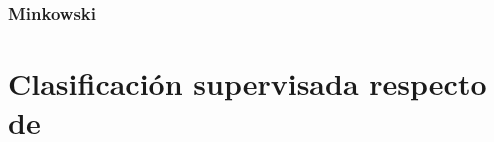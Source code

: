 \documentclass[10pt,a4paper]{article}
\begin{document}
\subsubsection{Minkowski}

\section{Clasificación supervisada respecto de }

%
%
%
%
%
%
%
%
%
%
\end{document}
